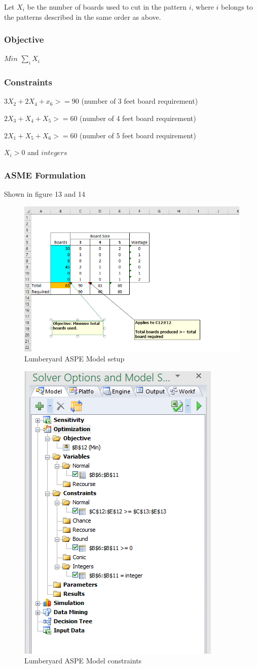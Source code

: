 \documentclass[]{article}
\begin{document}
Let \(X_{i}\) be the number of boards used to cut in the pattern \(i\),
where \(i\) belongs to the patterns described in the same order as
above.

\subsubsection{Objective}\label{objective}

\(Min\) \(\sum_{i} X_{i}\)

\subsubsection{Constraints}\label{constraints-2}

\(3X_{2} + 2X_{4} + x_{6} >= 90\) (number of 3 feet board requirement)

\(2X_{3} + X_{4} + X_{5} >= 60\) (number of 4 feet board requirement)

\(2X_{1} + X_{5} + X_{6} >= 60\) (number of 5 feet board requirement)

\(X_{i} > 0\) and \(integers\)

\subsubsection{ASME Formulation}\label{asme-formulation}

Shown in figure 13 and 14

\begin{figure}
\centering
\includegraphics[height=0.50000\textwidth]{Figures/Homework3/pEC.PNG}
\caption{Lumberyard ASPE Model setup}
\end{figure}

\begin{figure}
\centering
\includegraphics[height=0.40000\textwidth]{Figures/Homework3/modelpEC.PNG}
\caption{Lumberyard ASPE Model constraints}
\end{figure}
\end{document}
